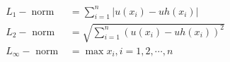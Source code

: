 \documentclass{article}
\numberwithin{equation}{subsection}    %
\begin{document}
\begin{appendix}
    \begin{equation}
        \begin{aligned}
            L_{1}-\operatorname{norm} & =\sum_{i=1}^{n}\left|u\left(x_{i}\right)-u h\left(x_{i}\right)\right|            \\
            L_{2}-\text { norm }      & =\sqrt{\sum_{i=1}^{n}\left(u\left(x_{i}\right)-u h\left(x_{i}\right)\right)^{2}} \\
            L_{\infty}-\text { norm } & =\max x_i,i=1,2,\cdots,n                                                         \\
        \end{aligned}
    \end{equation}





\end{appendix}



\end{document}
